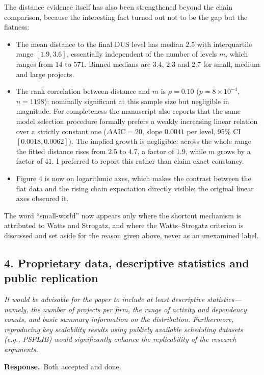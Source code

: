 \documentclass[11pt,a4paper]{article}
\newcommand{\rev}[1]{\medskip\noindent\textit{#1}\par\medskip}
\newcommand{\reply}{\noindent\textbf{Response.}\ }
\begin{document}
The distance evidence itself has also been strengthened beyond the chain
comparison, because the interesting fact turned out not to be the gap but the
flatness:

\begin{itemize}
\item The mean distance to the final DUS level has median $2.5$ with
interquartile range $[1.9, 3.6]$, essentially independent of the number of
levels $m$, which ranges from $14$ to $571$. Binned medians are $3.4$, $2.3$ and
$2.7$ for small, medium and large projects.
\item The rank correlation between distance and $m$ is $\rho = 0.10$
($p = 8\times10^{-4}$, $n = 1198$): nominally significant at this sample size
but negligible in magnitude. For completeness the manuscript also reports that
the same model selection procedure formally prefers a weakly increasing linear
relation over a strictly constant one ($\Delta\mathrm{AIC} = 20$, slope $0.0041$
per level, 95\% CI $[0.0018, 0.0062]$). The implied growth is negligible: across
the whole range the fitted distance rises from $2.5$ to $4.7$, a factor of
$1.9$, while $m$ grows by a factor of $41$. I preferred to report this rather
than claim exact constancy.
\item Figure 4 is now on logarithmic axes, which makes the contrast between the
flat data and the rising chain expectation directly visible; the original linear
axes obscured it.
\end{itemize}

The word ``small-world'' now appears only where the shortcut mechanism is
attributed to Watts and Strogatz, and where the Watts--Strogatz criterion is
discussed and set aside for the reason given above, never as an unexamined
label.

\subsection*{4. Proprietary data, descriptive statistics and public replication}

\rev{It would be advisable for the paper to include at least descriptive
statistics---namely, the number of projects per firm, the range of activity and
dependency counts, and basic summary information on the distribution.
Furthermore, reproducing key scalability results using publicly available
scheduling datasets (e.g., PSPLIB) would significantly enhance the replicability
of the research arguments.}

\reply Both accepted and done.
\end{document}
